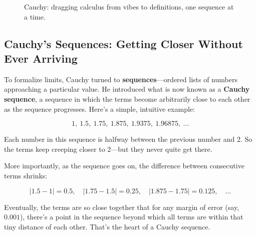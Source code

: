 \begin{figure}[H]
\centering
{}
\caption{Cauchy: dragging calculus from vibes to definitions, one sequence at a time.}
\end{figure}


\subsection{Cauchy’s Sequences: Getting Closer Without Ever Arriving}

To formalize limits, Cauchy turned to \textbf{sequences}—ordered lists of numbers approaching a particular value. He introduced what is now known as a \textbf{Cauchy sequence}, a sequence in which the terms become arbitrarily close to each other as the sequence progresses.  Here’s a simple, intuitive example:

\[
1,\ 1.5,\ 1.75,\ 1.875,\ 1.9375,\ 1.96875,\ \dots
\]

Each number in this sequence is halfway between the previous number and 2. So the terms keep creeping closer to 2—but they never quite get there.

More importantly, as the sequence goes on, the difference between consecutive terms shrinks:

\[
|1.5 - 1| = 0.5,\quad |1.75 - 1.5| = 0.25,\quad |1.875 - 1.75| = 0.125,\quad \dots
\]

Eventually, the terms are so close together that for any margin of error (say, $0.001$), there’s a point in the sequence beyond which all terms are within that tiny distance of each other. That’s the heart of a Cauchy sequence.

